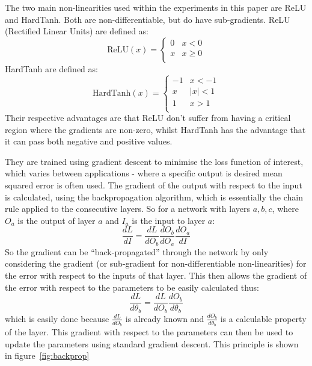 The two main non-linearities used within the experiments in this paper are ReLU and HardTanh. Both are non-differentiable, but do have sub-gradients. ReLU (Rectified Linear Units) are defined as:
\begin{equation}
\text{ReLU}(x) = \begin{cases}
0 & x < 0 \\
x & x \ge 0 \\
\end{cases}
\end{equation}
HardTanh are defined as:
\begin{equation}
\text{HardTanh}(x) = \begin{cases}
-1 & x < -1 \\
x & |x| < 1 \\
1 & x > 1 \\
\end{cases}
\end{equation}
Their respective advantages are that ReLU don't suffer from having a critical region where the gradients are non-zero, whilst HardTanh has the advantage that it can pass both negative and positive values.

They are trained using gradient descent to minimise the loss function of interest, which varies between applications - where a specific output is desired mean squared error is often used. The gradient of the output with respect to the input is calculated, using the backpropagation algorithm, which is essentially the chain rule applied to the consecutive layers. So for a network with layers $a, b, c$, where $O_a$ is the output of layer $a$ and $I_a$ is the input to layer $a$:
\begin{equation}
\frac{dL}{dI}  = \frac{dL}{dO_b} \frac{dO_b}{dO_a} \frac{dO_a}{dI} 
\end{equation} 
So the gradient can be ``back-propagated'' through the network by only considering the gradient (or sub-gradient for non-differentiable non-linearities) for the error with respect to the inputs of that layer. This then allows the gradient of the error with respect to the parameters to be easily calculated thus:
\begin{equation}
\frac{dL}{d\theta_b} = \frac{dL}{dO_b}\frac{dO_b}{d\theta_b} 
\end{equation}
which is easily done because $\frac{dL}{dO_b}$ is already known and $\frac{dO_b}{d\theta_b}$ is a calculable property of the layer. This gradient with respect to the parameters can then be used to update the parameters using standard gradient descent. This principle is shown in figure~\ref{fig:backprop}

